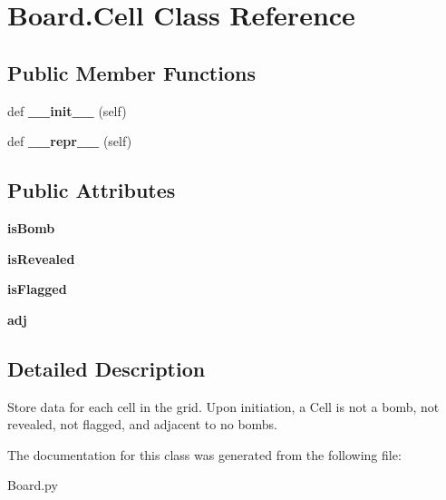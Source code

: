 \hypertarget{class_board_1_1_cell}{}\section{Board.\+Cell Class Reference}
\label{class_board_1_1_cell}
\subsection*{Public Member Functions}
\begin{DoxyCompactItemize}
\item 
\mbox{\label{class_board_1_1_cell_a2548d93fc7bc01d0eecf54adf83000b4}} 
def {\bfseries \+\_\+\+\_\+init\+\_\+\+\_\+} (self)
\item 
\mbox{\label{class_board_1_1_cell_a6dc4959d477451024c9fe91c42fa0cfc}} 
def {\bfseries \+\_\+\+\_\+repr\+\_\+\+\_\+} (self)
\end{DoxyCompactItemize}
\subsection*{Public Attributes}
\begin{DoxyCompactItemize}
\item 
\mbox{\label{class_board_1_1_cell_a913c21935677a853af4aaa8a9739119f}} 
{\bfseries is\+Bomb}
\item 
\mbox{\label{class_board_1_1_cell_a73d7ca13c0037b291b5b5e1fd5e9196c}} 
{\bfseries is\+Revealed}
\item 
\mbox{\label{class_board_1_1_cell_a58f47096e8869d206f3df85ef8035d0c}} 
{\bfseries is\+Flagged}
\item 
\mbox{\label{class_board_1_1_cell_a7b2f5856db6bd715a1c55517ee3b1400}} 
{\bfseries adj}
\end{DoxyCompactItemize}


\subsection{Detailed Description}
\begin{DoxyVerb}Store data for each cell in the grid. Upon initiation, a Cell is not a bomb,
not revealed, not flagged, and adjacent to no bombs.
\end{DoxyVerb}
 

The documentation for this class was generated from the following file\+:\begin{DoxyCompactItemize}
\item 
Board.\+py\end{DoxyCompactItemize}
